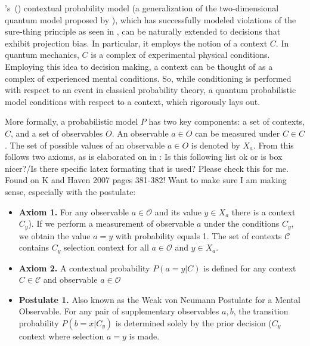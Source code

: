 \documentclass[12pt]{article}
\newcommand\citepos[1]{\citeauthor*{#1}'s\ (\citeyear{#1})}
\begin{document}
	 \citepos{khrennikov_haven_2009} contextual probability model (a generalization of the two-dimensional quantum model proposed by \cite{busemeyer}), which has successfully modeled violations of the sure-thing principle as seen in \cite{tversky_shafir_1992}, can be naturally extended to decisions that exhibit projection bias. In particular, it employs the notion of a context $C$. In quantum mechanics, $C$ is a complex of experimental physical conditions. Employing this idea to decision making, a context can be thought of as a complex of experienced mental conditions. So, while conditioning is performed with respect to an event in classical probability theory, a quantum probabilistic model conditions with respect to a context, which \cite{Khrennnikov10} rigorously lays out.
	 
	  More formally, a probabilistic model $P$ has two key components: a set of contexts, $C$, and a set of observables $O$. An observable $a \in O$ can be measured under $C \in C$. The set of possible values of an observable $a \in O$ is denoted by $X_a$. From this follows two axioms, as is elaborated on in \cite{Khrennnikov10}: {\sf Is this following list ok or is box nicer?/Is there specific latex formating that is used? Please check this for me. Found on K and Haven 2007 pages 381-382! Want to make sure I am making sense, especially with the postulate}:
	  \begin{itemize}
	  	\item[] \textbf{Axiom 1.} For any observable $a \in \mathcal{O}$ and its value $y \in X_a$ there is a context $C_y$). If we perform a measurement of observable $a$ under the conditions $C_y$, we obtain the value $a = y$ with probability equals 1. The set of contexts $\mathcal{C}$ contains $C_y$ selection context for all $ a \in \mathcal{O}$ and $ y \in X_a$.
	  	\item[] \textbf{Axiom 2.} A contextual probability $P(a=y|C)$ is defined for any context $C \in \mathcal{C}$ and observable $a \in \mathcal{O}$
	  	\item \textbf{Postulate 1.} Also known as the Weak von Neumann Postulate for a Mental Observable. For any pair of supplementary observables $a, b$, the transition probability $P(b=x|C_y)$ is determined solely by the prior decision ($C_y$ context where selection $a=y$ is made. 
	  \end{itemize}
\end{document}
